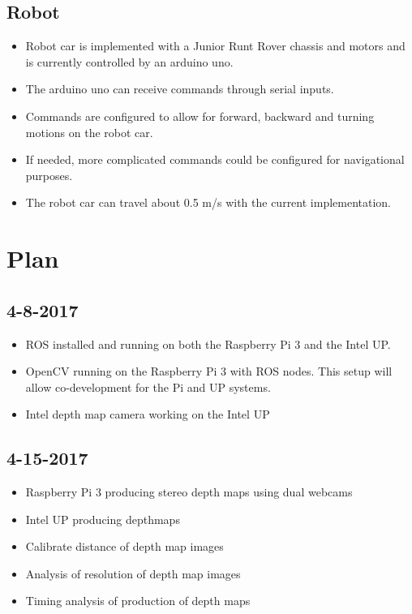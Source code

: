 \documentclass[11pt]{amsart}
\begin{document}
\subsection{Robot}
\begin{itemize}
\item Robot car is implemented with a Junior Runt Rover chassis and motors and is currently controlled by an arduino uno.
\item The arduino uno can receive commands through serial inputs.
\item Commands are configured to allow for forward, backward and turning motions on the robot car.
\item If needed, more complicated commands could be configured for navigational purposes.
\item The robot car can travel about 0.5 m/s with the current implementation.
\end{itemize}

\section{Plan}
\subsection*{4-8-2017}
\begin{itemize}
\item ROS installed and running on both the Raspberry Pi 3 and the Intel UP.
\item OpenCV running on the Raspberry Pi 3 with ROS nodes. This setup will allow co-development for the Pi and UP systems.
\item Intel depth map camera working on the Intel UP
\end{itemize}

\subsection*{4-15-2017}
\begin{itemize}
\item Raspberry Pi 3 producing stereo depth maps using dual webcams
\item Intel UP producing depthmaps
\item Calibrate distance of depth map images
\item Analysis of resolution of depth map images
\item Timing analysis of production of depth maps
\end{itemize}
\end{document}
